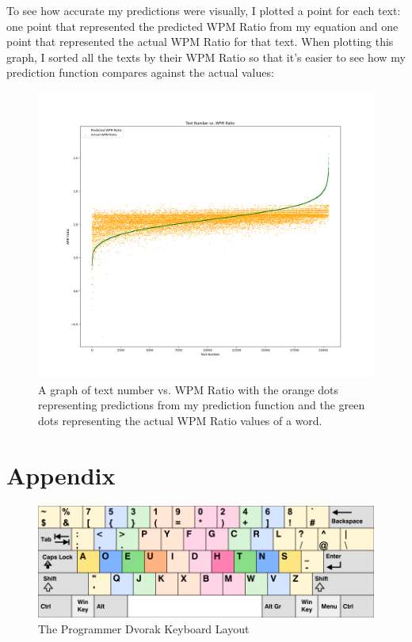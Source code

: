 \documentclass[12pt]{article}
\begin{document}
To see how accurate my predictions were visually, I plotted a point for each text: one point that represented the predicted WPM Ratio from my equation and one point that represented the actual WPM Ratio for that text. When plotting this graph, I sorted all the texts by their WPM Ratio so that it's easier to see how my prediction function compares against the actual values:

\begin{figure}[H]
	\caption{A graph of text number vs. WPM Ratio with the orange dots representing predictions from my prediction function and the green dots representing the actual WPM Ratio values of a word.}
	\includegraphics[width=\textwidth]{predictions.png}
\end{figure}




\section*{Appendix}

\begin{figure}[H]
	\caption{The Programmer Dvorak Keyboard Layout}
	\includegraphics[width=\textwidth]{programmer-dvorak.png}
\end{figure}
\end{document}
